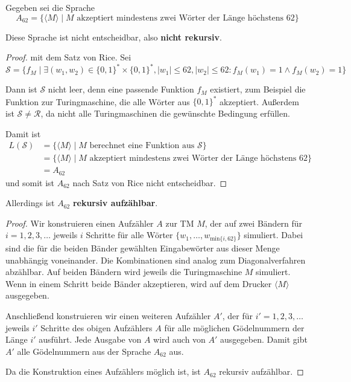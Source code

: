 Gegeben sei die Sprache
\[
A_{62} = \{\langle M \rangle \mid M \text{ akzeptiert mindestens zwei Wörter der
	Länge höchstens } 62 \}
\]

Diese Sprache ist nicht entscheidbar, also \textbf{nicht rekursiv}.

\begin{proof}
mit dem Satz von Rice. Sei 
\[
\mathcal{S} = \{f_M \mid \exists (w_1, w_2) \in \{0,1\}^* \times \{0,1\}^*,
	|w_1| \leq 62, |w_2| \leq 62 : f_M(w_1) = 1 \land f_M(w_2) = 1\}
\]

Dann ist $\mathcal{S}$ nicht leer, denn eine passende Funktion $f_M$ existiert,
zum Beispiel die Funktion zur Turingmaschine, die alle Wörter aus $\{0, 1\}^*$
akzeptiert. Außerdem ist $\mathcal{S} \neq \mathcal{R}$, da nicht alle
Turingmaschinen die gewünschte Bedingung erfüllen.

Damit ist
\begin{align*}
	L(\mathcal{S}) &= \{ \langle M \rangle \mid M
		\text{ berechnet eine Funktion aus }\mathcal{S}\} \\
	&= \{ \langle M \rangle \mid M
		\text{ akzeptiert mindestens zwei Wörter der Länge höchstens } 62 \} \\
	&= A_{62}
\end{align*}
und somit ist $A_{62}$ nach Satz von Rice nicht entscheidbar.
\end{proof}

Allerdings ist $A_{62}$ \textbf{rekursiv aufzählbar}.

\begin{proof}
Wir konstruieren einen Aufzähler $A$ zur TM $M$, der auf zwei Bändern für
$i = 1, 2, 3, \dots$ jeweils $i$ Schritte für alle Wörter
$\{w_1, \dots, w_{\text{min}\{i, 62\}}\}$ simuliert. Dabei sind die für die
beiden Bänder gewählten Eingabewörter aus dieser Menge unabhängig voneinander.
Die Kombinationen sind analog zum Diagonalverfahren abzählbar. Auf beiden
Bändern wird jeweils die Turingmaschine $M$ simuliert. Wenn in einem Schritt
beide Bänder akzeptieren, wird auf dem Drucker $\langle M \rangle$ ausgegeben.

Anschließend konstruieren wir einen weiteren Aufzähler $A'$, der für
$i' = 1, 2, 3, \dots$ jeweils $i'$ Schritte des obigen Aufzählers $A$ für alle
möglichen Gödelnummern der Länge $i'$ ausführt. Jede Ausgabe von $A$ wird auch
von $A'$ ausgegeben. Damit gibt $A'$ alle Gödelnummern aus der Sprache $A_{62}$
aus.

Da die Konstruktion eines Aufzählers möglich ist, ist $A_{62}$ rekursiv
aufzählbar.
\end{proof}
